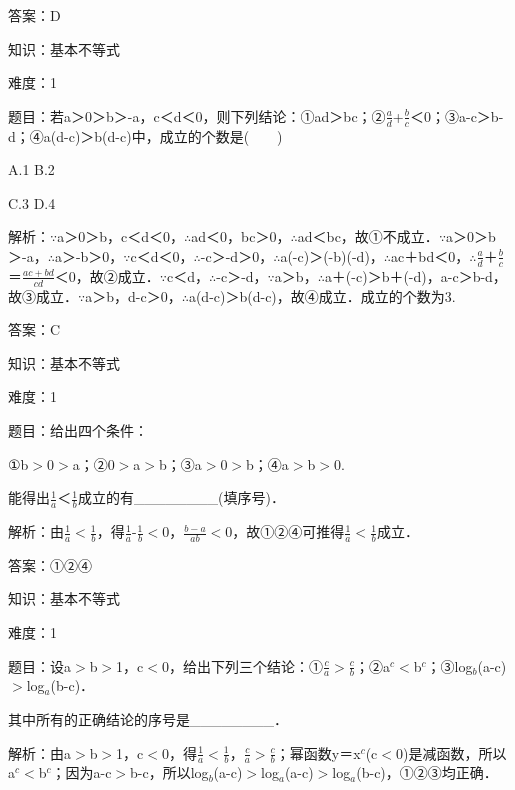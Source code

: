 \documentclass{article} %
\begin{document}
答案：D



知识：基本不等式

难度：1

题目：若a＞0＞b＞-a，c＜d＜0，则下列结论：①ad＞bc；②$\frac{a}{d}$+$\frac{b}{c}$＜0；③a-c＞b-d；④a(d-c)＞b(d-c)中，成立的个数是(　　)

A.1   B.2

C.3   D.4

解析：$\mathrm{\because}$a＞0＞b，c＜d＜0，$\mathrm{\therefore}$ad＜0，bc＞0，$\mathrm{\therefore}$ad＜bc，故①不成立．$\mathrm{\because}$a＞0＞b＞-a，$\mathrm{\therefore}$a＞-b＞0，$\mathrm{\because}$c＜d＜0，$\mathrm{\therefore}$-c＞-d＞0，$\mathrm{\therefore}$a(-c)＞(-b)(-d)，$\mathrm{\therefore}$ac＋bd＜0，$\mathrm{\therefore}$$\frac{a}{d}$＋$\frac{b}{c}$＝$\frac{ac+bd}{cd}$＜0，故②成立．$\mathrm{\because}$c＜d，$\mathrm{\therefore}$-c＞-d，$\mathrm{\because}$a＞b，$\mathrm{\therefore}$a＋(-c)＞b＋(-d)，a-c＞b-d，故③成立．$\mathrm{\because}$a＞b，d-c＞0，$\mathrm{\therefore}$a(d-c)＞b(d-c)，故④成立．成立的个数为3.

答案：C



知识：基本不等式

难度：1

题目：给出四个条件：

①b$\mathrm{>}$0$\mathrm{>}$a；②0$\mathrm{>}$a$\mathrm{>}$b；③a$\mathrm{>}$0$\mathrm{>}$b；④a$\mathrm{>}$b$\mathrm{>}$0.

能得出$\frac{1}{a}$＜$\frac{1}{b}$成立的有\_\_\_\_\_\_\_\_(填序号)．

解析：由$\frac{1}{a}$$\mathrm{<}$$\frac{1}{b}$，得$\frac{1}{a}$-$\frac{1}{b}$$\mathrm{<}$0，$\frac{b-a}{ab}$$\mathrm{<}$0，故①②④可推得$\frac{1}{a}$$\mathrm{<}$$\frac{1}{b}$成立．

答案：①②④



知识：基本不等式

难度：1

题目：设a$\mathrm{>}$b$\mathrm{>}$1，c$\mathrm{<}$0，给出下列三个结论：①$\frac{c}{a}$$\mathrm{>}$$\frac{c}{b}$；②a${}^{c}$$\mathrm{<}$b${}^{c}$；③log${}_{b}$(a-c)$\mathrm{>}$log${}_{a}$(b-c)．

其中所有的正确结论的序号是\_\_\_\_\_\_\_\_．

解析：由a$\mathrm{>}$b$\mathrm{>}$1，c$\mathrm{<}$0，得$\frac{1}{a}$$\mathrm{<}$$\frac{1}{b}$，$\frac{c}{a}$$\mathrm{>}$$\frac{c}{b}$；幂函数y＝x${}^{c}$(c$\mathrm{<}$0)是减函数，所以a${}^{c}$$\mathrm{<}$b${}^{c}$；因为a-c$\mathrm{>}$b-c，所以log${}_{b}$(a-c)$\mathrm{>}$log${}_{a}$(a-c)$\mathrm{>}$log${}_{a}$(b-c)，①②③均正确．
\end{document}
